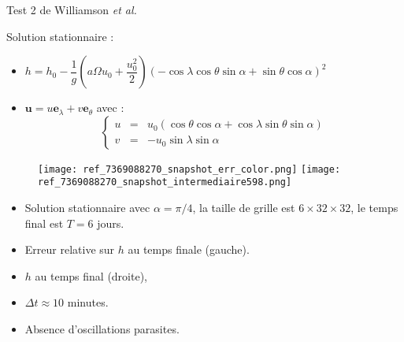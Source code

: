 \documentclass[11pt]{beamer}
\begin{document}

\begin{frame}{Test 2 de Williamson \textit{et al.}}

\begin{exampleblock}{Solution stationnaire :}
\begin{itemize}
\item $h = h_0 - \dfrac{1}{g} \left( a \Omega u_0 + \dfrac{u_0^2}{2} \right)\left( - \cos \lambda \cos \theta \sin \alpha + \sin \theta \cos \alpha \right)^2$
\item $\mathbf{u} = u \mathbf{e}_{\lambda}+ v \mathbf{e}_{\theta}$ avec :
\begin{equation*}
\left\lbrace \begin{array}{rcl}
 u & = & u_0 ( \cos \theta \cos \alpha + \cos \lambda \sin \theta \sin \alpha)\\
 v & = & -u_0 \sin \lambda \sin \alpha
 \end{array} \right.
\end{equation*}
\end{itemize}
\end{exampleblock}
\end{frame}


\begin{frame}{}
\begin{figure}
\texttt{[image: ref\_7369088270\_snapshot\_err\_color.png]}
\texttt{[image: ref\_7369088270\_snapshot\_intermediaire598.png]}
\end{figure}
\begin{itemize}
\item Solution stationnaire avec $\alpha=\pi/4$, la taille de grille est $6 \times 32 \times 32$, le temps final est $T=6$ jours.
\item Erreur relative sur $h$ au temps finale (gauche).
\item $h$ au temps final (droite),
\item $\Delta t \approx 10$ minutes.
\item Absence d'oscillations parasites.
\end{itemize}
\end{frame}

\end{document}
